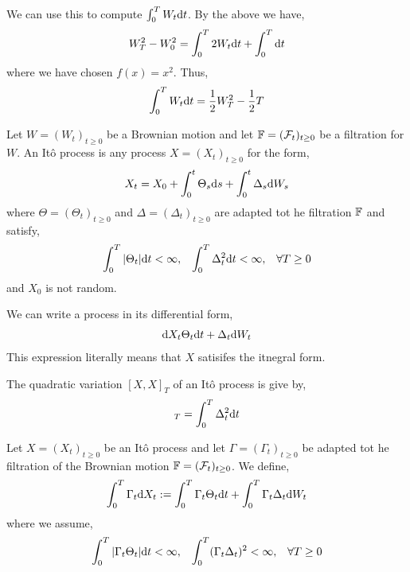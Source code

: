 \documentclass[12pt]{article}
\begin{document}
We can use this to compute \( \int_0^T W_t \mathrm{d} t \). By the above we have,
\begin{align*}
    W_T^2 - W_0^2 = \int_0^T 2 W_t\mathrm{d} t + \int_0^T \mathrm{d} t
\end{align*}
where we have chosen \( f(x) = x^2 \). Thus,
\begin{align*}
    \int_0^T W_t \mathrm{d} t = \frac{1}{2}W_T^2 - \frac{1}{2}T
\end{align*}

\begin{definition}[It\^o Process]
Let \( W = (W_t)_{t\geq 0} \) be a Brownian motion and let \( \mathbb{F} = (\mathcal{F}_t)_{t\geq 0} \) be a filtration for \( W \). An It\^o process is any process \( X = (X_t)_{t\geq 0} \) for the form,
\begin{align*}
    X_t = X_0 + \int_0^t \Theta_s\mathrm{d} s + \int_0^t \Delta_s \mathrm{d} W_s
\end{align*}
where \( \Theta = (\Theta_t)_{t\geq 0} \) and \( \Delta = (\Delta_t)_{t\geq 0} \) are adapted tot he filtration \( \mathbb{F} \) and satisfy,
\begin{align*}
    \int_0^T |\Theta_t|\mathrm{d} t < \infty, && \int_0^T \Delta_t^2\mathrm{d} t < \infty, && \forall T \geq 0
\end{align*}
and \( X_0 \) is not random.
\end{definition}

\begin{definition}
We can write a process in its differential form,
\begin{align*}
    \mathrm{d} X_t \Theta_t \mathrm{d} t + \Delta_t \mathrm{d} W_t
\end{align*}
This expression literally means that \( X \) satisifes the itnegral form.
\end{definition}

\begin{lemma}
The quadratic variation \( [X,X]_T \) of an It\^o process is give by,
\begin{align*}
    [X,X]_T = \int_0^T \Delta_t^2 \d t
\end{align*}
\end{lemma}

\begin{definition}
Let \( X = (X_t)_{t\geq 0} \) be an It\^o process and let \( \Gamma = (\Gamma_t)_{t\geq0} \) be adapted tot he filtration of the Brownian motion \( \mathbb{F} = (\mathcal{F}_t)_{t\geq 0} \). We define,
\begin{align*}
    \int_0^T \Gamma_t \mathrm{d} X_t := \int_0^T \Gamma_t \Theta_t \mathrm{d} t + \int_0^T \Gamma_t \Delta_t \mathrm{d} W_t
\end{align*}
where we assume,
\begin{align*}
    \int_0^T |\Gamma_t\Theta_t| \mathrm{d} t < \infty,
    && \int_0^T (\Gamma_t \Delta_t)^2 < \infty,
    && \forall T\geq 0
\end{align*}
\end{definition}
\end{document}
